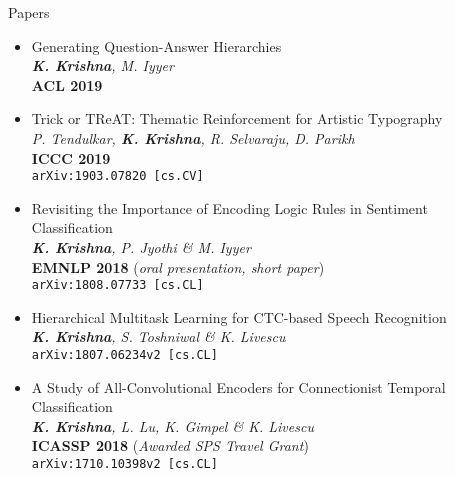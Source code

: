 \documentclass{resume} %
\begin{document}
\vspace*{-1.5mm}
\begin{rSection}{Papers}
\begin{itemize}[leftmargin=*]
\item Generating Question-Answer Hierarchies \\ \textit{\textbf{K. Krishna}, M. Iyyer} \\ \textbf{ACL 2019} 
\item Trick or TReAT: Thematic Reinforcement for Artistic Typography \\ \textit{P. Tendulkar, \textbf{K. Krishna}, R. Selvaraju, D. Parikh} \\ \textbf{ICCC 2019} \\ \texttt{arXiv:1903.07820 [cs.CV]} 
\item Revisiting the Importance of Encoding Logic Rules in Sentiment Classification \\ \textit{\textbf{K. Krishna}, P. Jyothi \& M. Iyyer} \\ \textbf{EMNLP 2018} (\textit{oral presentation, short paper}) \\
\texttt{arXiv:1808.07733 [cs.CL]}
\item Hierarchical Multitask Learning for CTC-based Speech Recognition  \\ \textit{\textbf{K. Krishna}, S. Toshniwal \& K. Livescu} \\ \texttt{arXiv:1807.06234v2 [cs.CL]} 
\item A Study of All-Convolutional Encoders for Connectionist Temporal Classification\\ \textit{\textbf{K. Krishna}, L. Lu, K. Gimpel \&  K. Livescu}\\ \textbf{ICASSP 2018} (\textit{Awarded SPS Travel Grant}) \\ \texttt{arXiv:1710.10398v2 [cs.CL]} 
\end{itemize}
\end{rSection}
\vspace*{-1.5mm}
\end{document}
